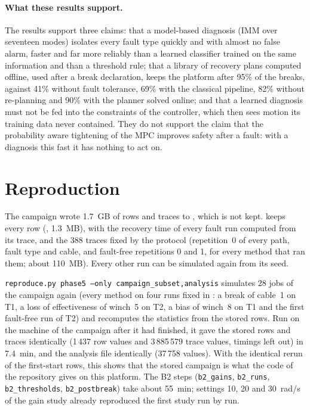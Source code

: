\documentclass[10pt]{article}
\begin{document}
\paragraph{What these results support.} The results support three claims: that a model-based diagnosis (IMM over seventeen modes) isolates every fault type quickly and with almost no false alarm, faster and far more reliably than a learned classifier trained on the same information and than a threshold rule; that a library of recovery plans computed offline, used after a break declaration, keeps the platform after 95\% of the breaks, against 41\% without fault tolerance, 69\% with the classical pipeline, 82\% without re-planning and 90\% with the planner solved online; and that a learned diagnosis must not be fed into the constraints of the controller, which then sees motion its training data never contained. They do not support the claim that the probability aware tightening of the MPC improves safety after a fault: with a diagnosis this fast it has nothing to act on.

\section{Reproduction}\label{sec:repro}

The campaign wrote 1.7~GB of rows and traces to , which is not kept.  keeps every row (, 1.3~MB), with the recovery time of every fault run computed from its trace, and the 388 traces fixed by the protocol (repetition~0 of every path, fault type and cable, and fault-free repetitions 0 and 1, for every method that ran them; about 110~MB). Every other run can be simulated again from its seed.

\texttt{reproduce.py phase5 --only campaign\_subset,analysis} simulates 28 jobs of the campaign again (every method on four runs fixed in : a break of cable~1 on T1, a loss of effectiveness of winch~5 on T2, a bias of winch~8 on T1 and the first fault-free run of T2) and recomputes the statistics from the stored rows. Run on the machine of the campaign after it had finished, it gave the stored rows and traces identically (1\,437 row values and 3\,885\,579 trace values, timings left out) in 7.4~min, and the analysis file identically (37\,758 values). With the identical rerun of the first-start rows, this shows that the stored campaign is what the code of the repository gives on this platform. The B2 steps (\texttt{b2\_gains}, \texttt{b2\_runs}, \texttt{b2\_thresholds}, \texttt{b2\_postbreak}) take about 55~min; settings 10, 20 and 30~rad/s of the gain study already reproduced the first study run by run.



\end{document}

